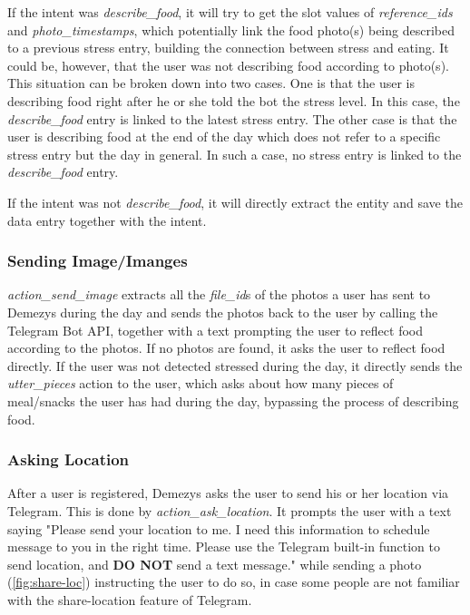If the intent was \emph{describe\_food}, it will try to get the slot values of \emph{reference\_ids} and \emph{photo\_timestamps}, which potentially link the food photo(s) being described to a previous stress entry, building the connection between stress and eating. It could be, however, that the user was not describing food according to photo(s). This situation can be broken down into two cases. One is that the user is describing food right after he or she told the bot the stress level. In this case, the \emph{describe\_food} entry is linked to the latest stress entry. The other case is that the user is describing food at the end of the day which does not refer to a specific stress entry but the day in general. In such a case, no stress entry is linked to the \emph{describe\_food} entry.

If the intent was not \emph{describe\_food}, it will directly extract the entity and save the data entry together with the intent.

\subsubsection{Sending Image/Imanges}
\emph{action\_send\_image} extracts all the \emph{file\_id}s of the photos a user has sent to Demezys during the day and sends the photos back to the user by calling the Telegram Bot API, together with a text prompting the user to reflect food according to the photos. If no photos are found, it asks the user to reflect food directly. If the user was not detected stressed during the day, it directly sends the \emph{utter\_pieces} action to the user, which asks about how many pieces of meal/snacks the user has had during the day, bypassing the process of describing food.

\subsubsection{Asking Location}
After a user is registered, Demezys asks the user to send his or her location via Telegram. This is done by \emph{action\_ask\_location}. It prompts the user with a text saying "Please send your location to me. I need this information to schedule message to you in the right time. Please use the Telegram built-in function to send location, and \textbf{DO NOT} send a text message." while sending a photo (\autoref{fig:share-loc}) instructing the user to do so, in case some people are not familiar with the share-location feature of Telegram.

